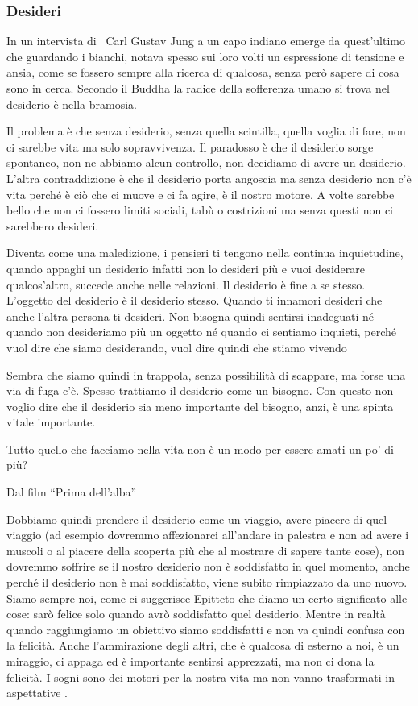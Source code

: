 \documentclass[12pt]{book} %
\begin{document}
\bigskip

\subsubsection{Desideri}
In un intervista di \ Carl Gustav Jung a un capo indiano emerge da quest'ultimo che guardando i
bianchi, notava spesso sui loro volti un espressione di tensione e ansia, come se fossero sempre alla ricerca di
qualcosa, senza però sapere di cosa sono in cerca. Secondo il Buddha la radice della sofferenza umano si trova nel
desiderio è nella bramosia.

Il problema è che senza desiderio, senza quella scintilla, quella voglia di fare, non ci sarebbe vita ma solo
sopravvivenza. Il paradosso è che il desiderio sorge spontaneo, non ne abbiamo alcun controllo, non decidiamo di avere
un desiderio. L'altra contraddizione è che il desiderio porta angoscia ma senza desiderio non c'è vita perché è ciò che
ci muove e ci fa agire, è il nostro motore. A volte sarebbe bello che non ci fossero limiti sociali, tabù o costrizioni
ma senza questi non ci sarebbero desideri.

Diventa come una maledizione, i pensieri ti tengono nella continua inquietudine, quando appaghi un desiderio infatti non
lo desideri più e vuoi desiderare qualcos'altro, succede anche nelle relazioni. Il desiderio è fine a se stesso.
L'oggetto del desiderio è il desiderio stesso. Quando ti innamori desideri che anche
l'altra persona ti desideri. Non bisogna quindi sentirsi inadeguati né quando non desideriamo più
un oggetto né quando ci sentiamo inquieti, perché vuol dire che siamo desiderando, vuol dire quindi che stiamo
vivendo

Sembra che siamo quindi in trappola, senza possibilità di scappare, ma forse una via di fuga c'è.
Spesso trattiamo il desiderio come un bisogno. Con questo non voglio dire che il desiderio sia meno importante del
bisogno, anzi, è una spinta vitale importante.

Tutto quello che facciamo nella vita non è un modo per essere amati un po' di più?

Dal film “Prima dell'alba”


\bigskip

Dobbiamo quindi prendere il desiderio come un viaggio, avere piacere di quel viaggio (ad esempio dovremmo affezionarci
all'andare in palestra e non ad avere i muscoli o al piacere della scoperta più che al mostrare di
sapere tante cose), non dovremmo soffrire se il nostro desiderio non è soddisfatto in quel momento, anche perché il
desiderio non è mai soddisfatto, viene subito rimpiazzato da uno nuovo. Siamo sempre noi, come ci suggerisce Epitteto
che diamo un certo significato alle cose: sarò felice solo quando avrò soddisfatto quel desiderio. Mentre in realtà
quando raggiungiamo un obiettivo siamo soddisfatti e non va quindi confusa con la felicità. Anche
l'ammirazione degli altri, che è qualcosa di esterno a noi, è un miraggio, ci appaga ed è
importante sentirsi apprezzati, ma non ci dona la felicità. I sogni sono dei motori per la nostra vita ma non vanno
trasformati in aspettative .
\end{document}

